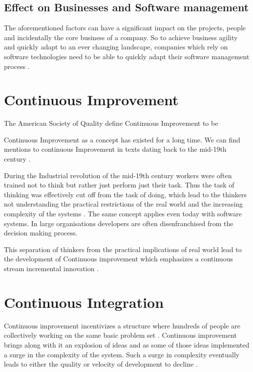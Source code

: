 \documentclass[12pt,conference]{IEEEtran}
\begin{document}
\subsection*{Effect on Businesses and Software management}

The aforementioned factors can have a significant impact on the projects, people and incidentally the core business of a company. So to achieve business agility and quickly adapt to an ever changing landscape, companies which rely on software technologies need to be able to quickly adapt their software management process \cite{mathiassen_business_2006}.

\section*{Continuous Improvement}

The American Society of Quality define Continuous Improvement to be 
 \cite{american_society_for_quality_continuous_????}

Continuous Improvement as a concept has existed for a long time. We can find mentions to continuous Improvement in texts dating back to the mid-19th century \cite{schroeder_americas_????}. 

During the Industrial revolution of the mid-19th century workers were often trained not to think but rather just perform just their task. Thus the task of thinking was effectively cut off from the task of doing, which lead to the thinkers not understanding the practical restrictions of the real world and the increasing complexity of the systems \cite{schroeder_americas_????}. The same concept applies even today with software systems. In large organisations developers are often disenfranchised from the decision making process.

This separation of thinkers from the practical implications of real world lead to the development of Continuous improvement which emphasizes a continuous stream incremental innovation \cite{bessant_rediscovering_1994}.

\section*{Continuous Integration}

Continuous improvement incentivizes a structure where hundreds of people are collectively working on the same basic problem set \cite{bessant_rediscovering_1994}. Continuous improvement brings along with it an explosion of ideas and as some of those ideas implemented a surge in the complexity of the system. Such a surge in complexity eventually leads to either the quality or velocity of development to decline \cite{zaytsev_increasing_2013} . 
\end{document}
